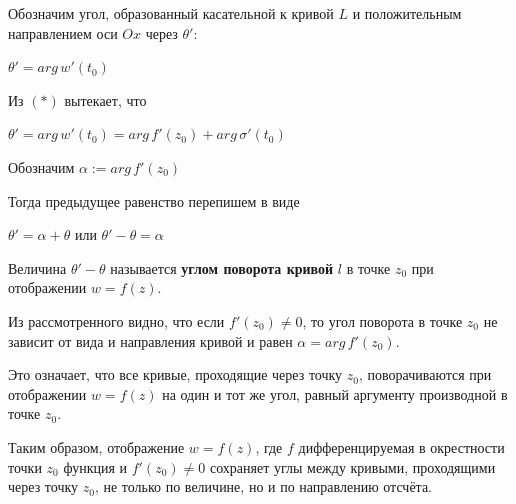 \documentclass[a4paper, 12pt]{report}
\begin{document}
\par Обозначим угол, образованный касательной к кривой $L$ и положительным направлением оси $Ox$ через $\theta'$:
\begin{center}
    $\theta' = arg \, w'(t_0)$
\end{center}
\par Из $(*)$ вытекает, что 
\begin{center}
    $\theta' = arg \, w'(t_0) = arg \, f'(z_0) + arg \, \sigma'(t_0)$
\end{center}
\par Обозначим $\alpha := arg \, f'(z_0)$
\par Тогда предыдущее равенство перепишем в виде
\begin{center}
    $\theta' = \alpha + \theta$ \quad или \quad $\theta' - \theta = \alpha$ 
\end{center}
\par Величина $\theta' - \theta$ называется \textbf{углом поворота кривой} $l$ в точке $z_0$ при отображении $w = f(z)$.
\par\bigskip
Из рассмотренного видно, что если $f'(z_0) \not= 0$, то угол поворота в точке $z_0$ не зависит от вида и направления кривой и равен $\alpha = arg \, f'(z_0)$.
\par Это означает, что все кривые, проходящие через точку $z_0$, поворачиваются при отображении $w = f(z)$ на один и тот же угол, равный аргументу производной в точке $z_0$.
\par\bigskip Таким образом, отображение $w = f(z)$, где $f$ дифференцируемая в окрестности точки $z_0$ функция и $f'(z_0) \not= 0$ сохраняет углы между кривыми, проходящими через точку $z_0$, не только по величине, но и по направлению отсчёта.
\end{document}

